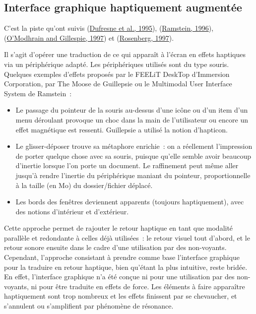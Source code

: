 \documentclass[
]{book}
\providecommand{\tightlist}{%
  \setlength{\itemsep}{0pt}\setlength{\parskip}{0pt}}
\begin{document}
\hypertarget{interface-graphique-haptiquement-augmentuxe9e}{%
\subsection{Interface graphique haptiquement augmentée}\label{interface-graphique-haptiquement-augmentuxe9e}}

C'est la piste qu'ont suivis (\protect\hyperlink{ref-dufresne1995multimodal}{Dufresne et al., 1995}),
(\protect\hyperlink{ref-ramstein1996combining}{Ramstein, 1996}), (\protect\hyperlink{ref-o1997moose}{O'Modhrain and Gillespie, 1997}) et (\protect\hyperlink{ref-rosenberg1997feelit}{Rosenberg, 1997}).

Il s'agit d'opérer une traduction de ce qui apparaît à l'écran en effets
haptiques via un périphérique adapté. Les périphériques utilisés sont du type
souris. Quelques exemples d'effets proposés par le FEELiT DeskTop d'Immersion
Corporation, par The Moose de Guillepsie ou le Multimodal User Interface
System de Ramstein~:

\begin{itemize}
\tightlist
\item
  Le passage du pointeur de la souris au-dessus d'une
  icône ou d'un item d'un menu déroulant provoque un choc dans la main de
  l'utilisateur ou encore un effet magnétique est ressenti. Guillepsie a
  utilisé la notion d'hapticon.
\item
  Le glisser-déposer trouve sa métaphore
  enrichie~: on a réellement l'impression de porter quelque chose avec
  sa souris, puisque qu'elle semble avoir beaucoup d'inertie lorsque l'on
  porte un document. Le raffinement peut même aller jusqu'à rendre l'inertie
  du périphérique maniant du pointeur, proportionnelle à la taille (en Mo) du
  dossier/fichier déplacé.
\item
  Les bords des fenêtres deviennent apparents
  (toujours haptiquement), avec des notions d'intérieur et d'extérieur.
\end{itemize}

Cette approche permet de rajouter le retour haptique en tant que modalité
parallèle et redondante à celles déjà utilisées~: le retour visuel tout
d'abord, et le retour sonore ensuite dans le cadre d'une utilisation par des
non-voyants. Cependant, l'approche consistant à prendre comme base
l'interface graphique pour la traduire en retour haptique, bien qu'étant la
plus intuitive, reste bridée. En effet, l'interface graphique n'a été conçue
ni pour une utilisation par des non-voyants, ni pour être traduite en effets
de force. Les éléments à faire apparaître haptiquement sont trop nombreux et
les effets finissent par se chevaucher, et s'annulent ou s'amplifient par
phénomène de résonance.
\end{document}

